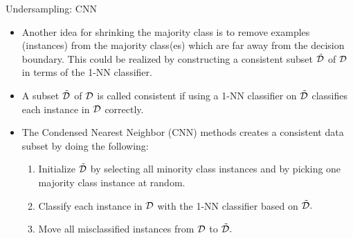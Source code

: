 	\begin{frame}{Undersampling: CNN}
	
	\footnotesize{
		\begin{itemize}
			\item Another idea for shrinking the majority class is to remove examples (instances) from the majority class(es) which are far away from the decision boundary. This could be realized by constructing a consistent subset $\tilde{\mathcal{D}}$ of $\mathcal{D}$ in terms of the 1-NN classifier. 
%			
			\item A subset $\tilde{\mathcal{D}}$ of $\mathcal{D}$ is called consistent if using a 1-NN classifier on $\tilde{\mathcal{D}}$ classifies each instance in $\mathcal{D}$ correctly.
%			
		\end{itemize}
		\begin{minipage}{0.55\textwidth}	
			\begin{itemize}
%				
				\item The Condensed Nearest Neighbor (CNN) methods creates a consistent data subset by doing the following:
%				
				\begin{enumerate} \footnotesize
					\item Initialize $\tilde{\mathcal{D}}$ by selecting all minority class instances and by picking one majority class instance at random.
					\item Classify each instance in $\mathcal{D}$ with the 1-NN classifier based on $\tilde{\mathcal{D}}.$
					\item Move all misclassified instances from $\mathcal{D}$ to $\tilde{\mathcal{D}}.$
					

\end{enumerate}
\end{itemize}
\end{minipage}}
\end{frame}
